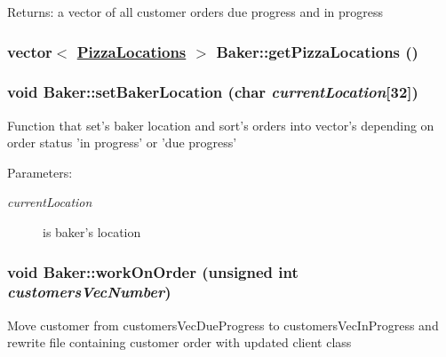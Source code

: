 \begin{Desc}
\item[Returns:]a vector of all customer orders due progress and in progress \end{Desc}
\hypertarget{class_baker_3d38e7498fba59674c7d3838bf4c1824}{
\subsubsection[getPizzaLocations]{\setlength{\rightskip}{0pt plus 5cm}vector$<$ \hyperlink{class_pizza_locations}{Pizza\-Locations} $>$ Baker::get\-Pizza\-Locations ()}}
\label{class_baker_3d38e7498fba59674c7d3838bf4c1824}


\hypertarget{class_baker_b85151ecb20282d81b4dab489fea7dd8}{
\subsubsection[setBakerLocation]{\setlength{\rightskip}{0pt plus 5cm}void Baker::set\-Baker\-Location (char {\em current\-Location}\mbox{[}32\mbox{]})}}
\label{class_baker_b85151ecb20282d81b4dab489fea7dd8}


Function that set's baker location and sort's orders into vector's depending on order status 'in progress' or 'due progress'

\begin{Desc}
\item[Parameters:]
\begin{description}
\item[{\em current\-Location}]is baker's location \end{description}
\end{Desc}
\hypertarget{class_baker_9616413c80f3814907a9c2399ac50438}{
\subsubsection[workOnOrder]{\setlength{\rightskip}{0pt plus 5cm}void Baker::work\-On\-Order (unsigned int {\em customers\-Vec\-Number})}}
\label{class_baker_9616413c80f3814907a9c2399ac50438}


Move customer from customers\-Vec\-Due\-Progress to customers\-Vec\-In\-Progress and rewrite file containing customer order with updated client class

